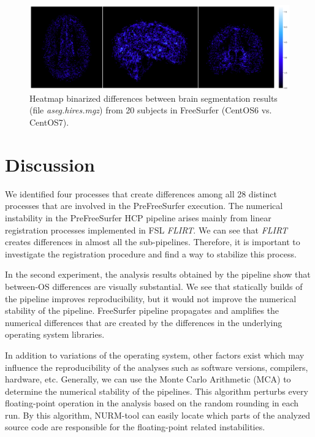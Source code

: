 \documentclass[a4paper,num-refs]{oup-contemporary}
\begin{document}
\begin{figure}
\centering
  \includegraphics[width=\columnwidth]{images/brain_classification.png} 
  \caption{Heatmap binarized differences between brain segmentation results (file \emph{aseg.hires.mgz}) from 
          20 subjects in FreeSurfer (CentOS6 vs. CentOS7).} 
  \label{fig:tissue_class}
\end{figure}


\section{Discussion}

We identified four processes that create differences 
among all 28 distinct processes that are involved in the PreFreeSurfer execution. 
The numerical instability in the 
PreFreeSurfer HCP pipeline arises mainly from linear 
registration processes implemented in FSL \emph{FLIRT}. 
We can see that \emph{FLIRT} creates differences in almost all the sub-pipelines. 
Therefore, it is important to investigate the registration procedure and find 
a way to stabilize this process. 

In the second experiment, 
the analysis results obtained by the pipeline show that between-OS differences are visually substantial.
We see that statically builds of the pipeline improves reproducibility, but 
it would not improve the numerical stability of the pipeline. 
FreeSurfer pipeline propagates and amplifies the numerical differences that are created by the 
differences in the underlying operating system libraries.

In addition to variations of the operating system, other factors exist which may influence 
the reproducibility of the analyses such as software versions, compilers, hardware, etc.
Generally, we can use the Monte Carlo Arithmetic (MCA) to determine the numerical stability of the pipelines.
This algorithm perturbs every floating-point operation 
in the analysis based on the random rounding in each run. 
By this algorithm, NURM-tool can easily locate which parts of the analyzed source code are responsible 
for the floating-point related instabilities.
\end{document}
